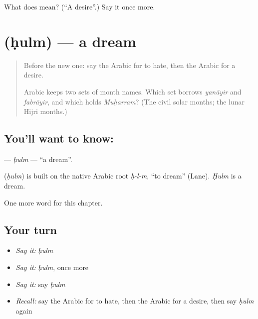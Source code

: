 \begin{tcolorbox}[breakable,colback=teal!4,colframe=teal!35!black,title={Before you move on}]
What does  mean? (\textquotedblleft{}A desire\textquotedblright{}.) Say it once more.
\end{tcolorbox}
\section[\texorpdfstring{\ar{حلم} (ḥulm)}{حلم (ḥulm)}]{ (ḥulm) — a dream}

\label{lesson:AR-C113-hulm}



\begin{quote}
Before the new one: say the Arabic for to hate, then the Arabic for a desire.

Arabic keeps two sets of month names. Which set borrows \emph{yanāyir} and \emph{fabrāyir}, and which holds \emph{Muḥarram}? (The civil solar months; the lunar Hijri months.)
\end{quote}

\subsection*{You'll want to know: }
\textbf{} — \emph{ḥulm} — \textquotedblleft{}a dream\textquotedblright{}.

\begin{cousinweb}
\textbf{} (\emph{ḥulm}) is built on the native Arabic root \emph{ḥ-l-m}, \textquotedblleft{}to dream\textquotedblright{} (Lane). \emph{Ḥulm} is a dream.
\end{cousinweb}

\begin{grammarlens}[title={What you've built}]
One more word for this chapter.
\end{grammarlens}

\subsection*{Your turn}
\begin{itemize}
\raggedright
  \item \emph{Say it:} \emph{ḥulm}
  \item \emph{Say it:} \emph{ḥulm}, once more
  \item \emph{Say it:} say \emph{ḥulm}
  \item \emph{Recall:} say the Arabic for to hate, then the Arabic for a desire, then say \emph{ḥulm} again
\end{itemize}

